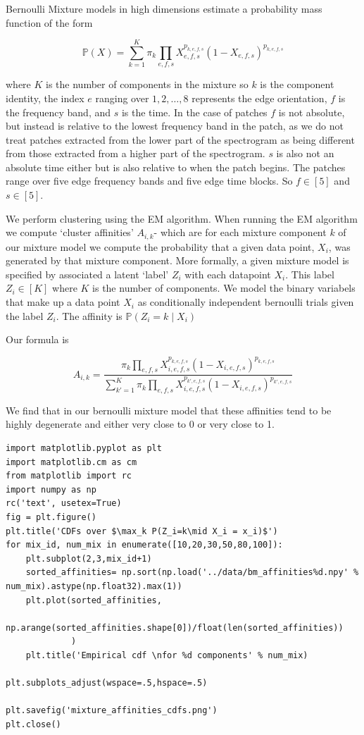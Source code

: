 \documentclass[11pt]{article}
\begin{document}
   Bernoulli Mixture models in high dimensions estimate a probability mass
   function of the form

   $$\mathbb{P}(X) = \sum_{k=1}^K \pi_k \prod_{e,f,s} X_{e,f,s}^{p_{k,e,f,s}} (1-X_{e,f,s})^{p_{k,e,f,s}}   $$

   where $K$ is the number of components in the mixture so $k$ is the
   component identity, the index $e$ ranging over ${1,2,\ldots,8}$
   represents the edge orientation, $f$ is the frequency band, and $s$
   is the time.  In the case of patches $f$ is not absolute, but
   instead is relative to the lowest frequency band in the patch, as
   we do not treat patches extracted from the lower part of the
   spectrogram as being different from those extracted from a higher
   part of the spectrogram.  $s$ is also not an absolute time either
   but is also relative to when the patch begins. The patches range
   over five edge frequency bands and five edge time blocks. So $f\in [ 5 ]$
   and $s\in [ 5 ]$.

   We perform clustering using the EM algorithm.  When running the EM
   algorithm we compute `cluster affinities' $A_{i,k}$- which are for
   each mixture component $k$ of our mixture model we compute the
   probability that a given data point, $X_i$, was generated by that
   mixture component.  More formally, a given mixture model is
   specified by associated a latent `label' $Z_i$ with each datapoint
   $X_i$.  This label $Z_i\in [K]$ where $K$ is the number of
   components.  We model the binary variabels that make up a data
   point $X_i$ as conditionally independent bernoulli trials given the
   label $Z_i$.  The affinity is $\mathbb{P}(Z_i = k\mid X_i)$

   Our formula is

   $$ A_{i,k} =\frac{\pi_k\prod_{e,f,s} X_{i,e,f,s}^{p_{k,e,f,s}} (1-X_{i,e,f,s})^{p_{k,e,f,s}}  }
   {\sum_{k'=1}^K \pi_k\prod_{e,f,s} X_{i,e,f,s}^{p_{k',e,f,s}} (1-X_{i,e,f,s})^{p_{k',e,f,s}}  }$$

   We find that in our bernoulli mixture model that these affinities tend to be highly degenerate and either very close to 0
   or very close to 1.


\begin{verbatim}
import matplotlib.pyplot as plt
import matplotlib.cm as cm
from matplotlib import rc
import numpy as np
rc('text', usetex=True)
fig = plt.figure()
plt.title('CDFs over $\max_k P(Z_i=k\mid X_i = x_i)$')
for mix_id, num_mix in enumerate([10,20,30,50,80,100]):
    plt.subplot(2,3,mix_id+1)
    sorted_affinities= np.sort(np.load('../data/bm_affinities%d.npy' % num_mix).astype(np.float32).max(1))
    plt.plot(sorted_affinities,
             np.arange(sorted_affinities.shape[0])/float(len(sorted_affinities))
             )
    plt.title('Empirical cdf \nfor %d components' % num_mix)

plt.subplots_adjust(wspace=.5,hspace=.5)

plt.savefig('mixture_affinities_cdfs.png')
plt.close()
\end{verbatim}
\end{document}
